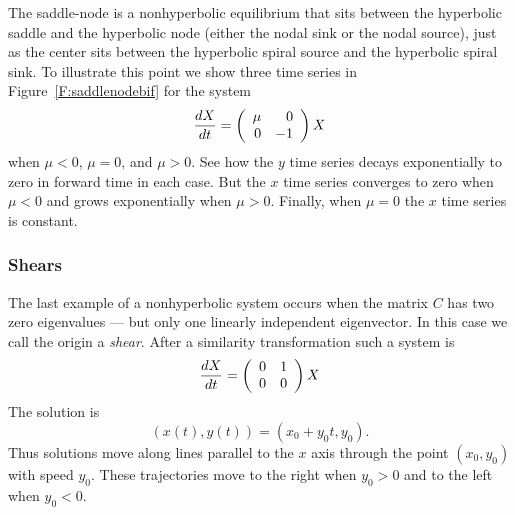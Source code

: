 \documentclass{ximera}
\begin{document}
\begin{figure*}[htb]
     \centerline{%
     }
     \caption{(Left) Phase portrait of \protect\eqref{e:10ev}.
	(Right) Time series of a solution.}
     \label{F:10ev}
\end{figure*}

The saddle-node is a
nonhyperbolic equilibrium
that sits between
the hyperbolic saddle and the hyperbolic node (either the nodal
sink or the nodal source), just as the center sits
between the hyperbolic spiral source and the hyperbolic spiral sink.  To
illustrate this point we show three time series in
Figure~\ref{F:saddlenodebif} for the system
\begin{equation}  \label{e:saddlenodebif}
\frac{dX}{dt}  =  \left(\begin{array}{rr} \mu & 0\\ 0 &-1\end{array}\right)X
\end{equation}
when $\mu<0$, $\mu=0$, and $\mu>0$.  See how the $y$ time series
decays exponentially to zero in forward time in each case.  But
the $x$ time series converges to zero when $\mu<0$ and grows
exponentially when $\mu>0$.  Finally, when $\mu=0$ the $x$ time
series is constant.

\begin{figure*}[htb]
     \centerline{%
     }
     \caption{Time series for solutions of \protect\eqref{e:saddlenodebif}
	when $\mu=-0.2,0,0.2$.}
     \label{F:saddlenodebif}
\end{figure*}


\subsubsection*{Shears}

The last example of a nonhyperbolic system occurs when the matrix $C$
has two zero eigenvalues --- but only one linearly independent
eigenvector.  In this case we call the origin a {\em shear\/}.  After a
similarity transformation such a system is
\begin{equation}  \label{e:00}
\frac{dX}{dt} = \left(\begin{array}{rr} 0 & 1\\ 0 &0\end{array}\right) X
\end{equation}
The solution is
\[
(x(t),y(t)) = (x_0+y_0t,y_0).
\]
Thus solutions move along lines parallel to the $x$ axis through
the point $(x_0,y_0)$ with speed $y_0$.  These trajectories move
to the right when $y_0>0$ and to the left when $y_0<0$.
\end{document}
